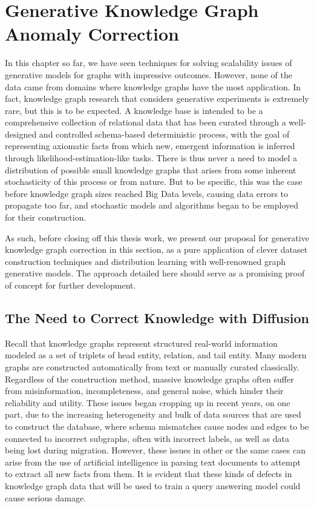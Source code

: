 \section{Generative Knowledge Graph Anomaly Correction}
\label{sec: kg_generation}

In this chapter so far, we have seen techniques for solving scalability issues of generative models for graphs with impressive outcomes. However, none of the data came from domains where knowledge graphs have the most application. In fact, knowledge graph research that considers generative experiments is extremely rare, but this is to be expected. A knowledge base is intended to be a comprehensive collection of relational data that has been curated through a well-designed and controlled schema-based deterministic process, with the goal of representing axiomatic facts from which new, emergent information is inferred through likelihood-estimation-like tasks. There is thus never a need to model a distribution of possible small knowledge graphs that arises from some inherent stochasticity of this process or from nature. But to be specific, this was the case before knowledge graph sizes reached Big Data levels, causing data errors to propagate too far, and stochastic models and algorithms began to be employed for their construction. 

As such, before closing off this thesis work, we present our proposal for generative knowledge graph correction in this section, as a pure application of clever dataset construction techniques and distribution learning with well-renowned graph generative models. The approach detailed here should serve as a promising proof of concept for further development. 

\subsection{The Need to Correct Knowledge with Diffusion}

Recall that knowledge graphs represent structured real-world information modeled as a set of triplets
of head entity, relation, and tail entity. Many modern graphs are constructed automatically from
text or manually curated classically. Regardless of the construction method, massive knowledge graphs often suffer from misinformation, incompleteness, and general noise, which hinder their reliability and utility. These issues began cropping up in recent years, on one part, due to the increasing heterogeneity and bulk of data sources that are used to construct the database, where schema mismatches cause nodes and edges to be connected to incorrect subgraphs, often with incorrect labels, as well as data being lost during migration. However, these issues in other or the same cases can arise from the use of artificial intelligence in parsing text documents to attempt to extract all new facts from them. It is evident that these kinds of defects in knowledge graph data that will be used to train a query answering model could cause serious damage.

